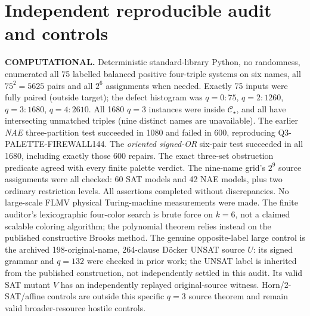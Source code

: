 \documentclass[11pt]{article}
\newcommand{\CS}{\mathcal C_\star}
\begin{document}
\section{Independent reproducible audit and controls}
\textbf{COMPUTATIONAL.} Deterministic standard-library Python,
no randomness, enumerated all 75 labelled balanced positive
four-triple systems on six names, all $75^2=5625$ pairs and
all $2^6$ assignments when needed. Exactly 75 inputs were
fully paired (outside target); the defect histogram was
$q=0:75$, $q=2:1260$, $q=3:1680$, $q=4:2610$.
All 1680 $q=3$ instances were inside $\CS$, and all have
intersecting unmatched triples (nine distinct names are
unavailable). The earlier \emph{NAE} three-partition test
succeeded in 1080 and failed in 600, reproducing
Q3-PALETTE-FIREWALL144. The \emph{oriented signed-OR}
six-pair test succeeded in all 1680, including exactly those
600 repairs. The exact three-set obstruction predicate
agreed with every finite palette verdict.
The nine-name grid's $2^9$ source assignments were all checked:
60 SAT models and 42 NAE models, plus two ordinary restriction
levels. All assertions completed without discrepancies.
No large-scale FLMV physical Turing-machine measurements
were made. The finite auditor's lexicographic four-color
search is brute force on $k=6$, not a claimed scalable
coloring algorithm; the polynomial theorem relies instead
on the published constructive Brooks method.
The genuine opposite-label large control is the archived
198-original-name, 264-clause D\"ocker UNSAT source $U$:
its signed grammar and $q=132$ were checked in prior work;
the UNSAT label is inherited from the published construction,
not independently settled in this audit. Its valid SAT mutant
$V$ has an independently replayed original-source witness.
Horn/2-SAT/affine controls are outside this specific $q=3$
source theorem and remain valid broader-resource hostile
controls.
\end{document}
